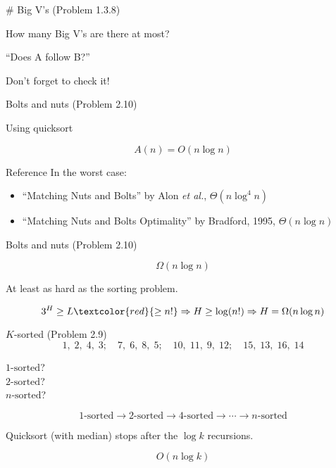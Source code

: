 \begin{frame}{\# Big V's (Problem 1.3.8)}
  \centerline{How many Big V's are there at most?}

  \pause
  \vspace{0.50cm}
  \centerline{``Does A follow B?''}

  \pause
  \vspace{0.50cm}
  \centerline{Don't forget to check it!}
\end{frame}
\begin{frame}{Bolts and nuts (Problem 2.10)}

  \pause
  \centerline{Using quicksort}

  \pause
  \[
	A(n) = O(n \log n)
  \]

  \pause
  \begin{alertblock}{Reference}
	In the worst case:
	\begin{itemize}
	  \item ``Matching Nuts and Bolts'' by Alon \emph{et al.}, $\Theta(n \log^4 n)$
	  \pause
	  \item ``Matching Nuts and Bolts Optimality'' by Bradford, 1995, $\Theta(n \log n)$ 
	\end{itemize}
  \end{alertblock}

\end{frame}
\begin{frame}{Bolts and nuts (Problem 2.10)}

  \[
	\Omega(n \log n)
  \]

  \pause
  \centerline{At least as hard as the sorting problem.}

  \pause
  \[
	3^{H} \ge L \textcolor{red}{\ge n!} \Rightarrow H \ge \log (n!) \Rightarrow H = \Omega(n \log n)
  \]
\end{frame}
\begin{frame}{$K$-sorted (Problem 2.9)}
  \[
	1,\;2,\;4,\;3;\quad 7,\;6,\;8,\;5;\quad 10,\;11,\;9,\;12;\quad 15,\;13,\;16,\;14
  \]

  \pause
  \vspace{0.20cm}

  \begin{center}
	$1\text{-sorted}$? \\ \pause
	$2\text{-sorted}$? \\ \pause
	$n\text{-sorted}$?
  \end{center}

  \pause
  \[
	1\text{-sorted} \to 2\text{-sorted} \to 4\text{-sorted} \to \cdots \to n\text{-sorted}
  \]

  \pause
  \centerline{Quicksort (with median) stops after the $\log k$ recursions.}

  \pause
  \[
	O(n \log k)
  \]
\end{frame}

